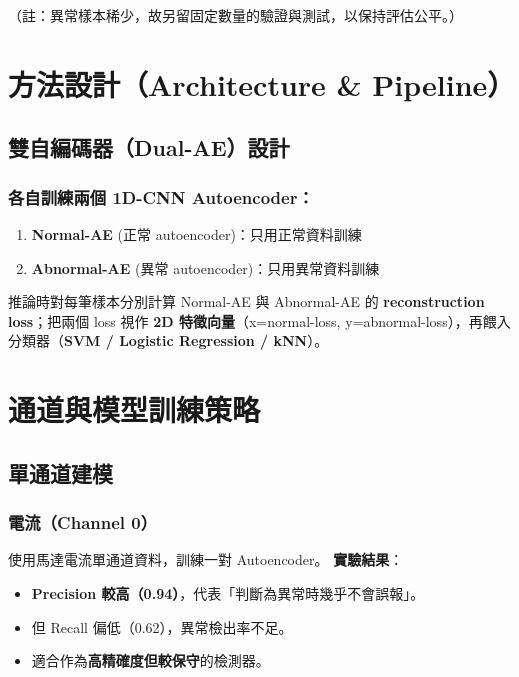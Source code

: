 \documentclass[12pt,a4paper]{article}
\begin{document}
（註：異常樣本稀少，故另留固定數量的驗證與測試，以保持評估公平。）

\section{方法設計（Architecture \& Pipeline）}

\subsection{雙自編碼器（Dual-AE）設計}

\subsubsection{各自訓練兩個 1D-CNN Autoencoder：}

\begin{enumerate}
    \item \textbf{Normal-AE} (正常 autoencoder)：只用正常資料訓練
    \item \textbf{Abnormal-AE} (異常 autoencoder)：只用異常資料訓練
\end{enumerate}

推論時對每筆樣本分別計算 Normal-AE 與 Abnormal-AE 的 \textbf{reconstruction loss}；把兩個 loss 視作 \textbf{2D 特徵向量}（x=normal-loss, y=abnormal-loss），再餵入分類器（\textbf{SVM / Logistic Regression / kNN}）。

\section{通道與模型訓練策略}

\subsection{單通道建模}

\subsubsection{電流（Channel 0）}

使用馬達電流單通道資料，訓練一對 Autoencoder。
\textbf{實驗結果}：

\begin{itemize}
    \item \textbf{Precision 較高（0.94）}，代表「判斷為異常時幾乎不會誤報」。
    \item 但 Recall 偏低（0.62），異常檢出率不足。
    \item 適合作為\textbf{高精確度但較保守}的檢測器。
\end{itemize}
\end{document}
